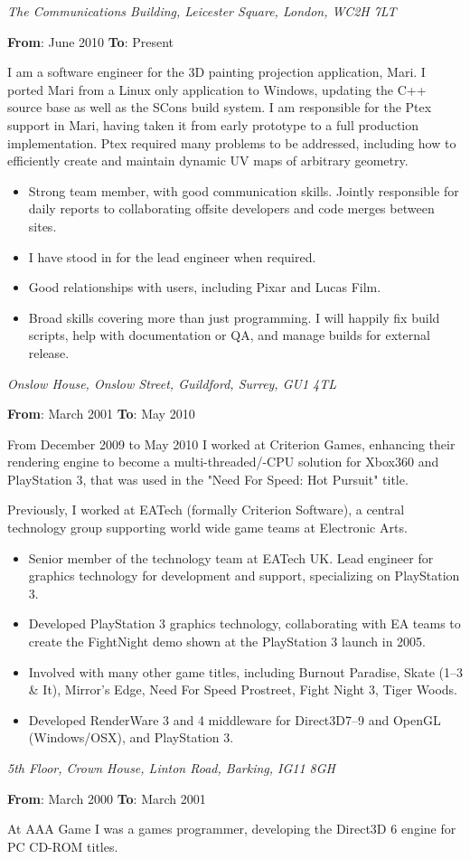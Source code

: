 \documentclass[a4paper,12pt]{article}
\newcommand{\cvheading}[1]{{\medskip\noindent\hspace{-5mm}{\sc #1}\par}}
\newcommand{\place}[2]{\vspace*{1ex}{\noindent\bf #1}\hfill{\it #2}\par}
\newcommand{\fromto}[2]{{\bf From}: #1 {\bf To}: #2\par}
\begin{document}
\cvheading{Work Experience}
\place{The Foundry VisionMongers}{The Communications Building, Leicester Square, London, WC2H 7LT}
\fromto{June 2010}{Present}
I am a software engineer for the 3D painting projection application, Mari. I ported Mari from a Linux only application to Windows, updating the C++ source base as well as the SCons build system. I am responsible for the Ptex support in Mari, having taken it from early prototype to a full production implementation. Ptex required many problems to be addressed, including how to efficiently create and maintain dynamic UV maps of arbitrary geometry.
\begin{itemize}
\item Strong team member, with good communication skills. Jointly responsible for daily reports to collaborating offsite developers and code merges between sites.
\item I have stood in for the lead engineer when required.
\item Good relationships with users, including Pixar and Lucas Film.
\item Broad skills covering more than just programming. I will happily fix build scripts, help with documentation or QA, and manage builds for external release.
\end{itemize}

\place{Electronic Arts}{Onslow House, Onslow Street, Guildford, Surrey, GU1 4TL}
\fromto{March 2001}{May 2010}
From December 2009 to May 2010 I worked at Criterion Games, enhancing their rendering engine to become a multi-threaded/-CPU solution for Xbox360 and PlayStation 3, that was used in the "Need For Speed: Hot Pursuit" title.

Previously, I worked at EATech (formally Criterion Software), a central technology group supporting world wide game teams at Electronic Arts.
\begin{itemize}
\item Senior member of the technology team at EATech UK. Lead engineer for graphics technology for development and support, specializing on PlayStation 3.
\item Developed PlayStation 3 graphics technology, collaborating with EA teams to create the FightNight demo shown at the PlayStation 3 launch in 2005.
\item Involved with many other game titles, including Burnout Paradise, Skate (1--3 \& It), Mirror's Edge, Need For Speed Prostreet, Fight Night 3, Tiger Woods.
\item Developed RenderWare 3 and 4 middleware for Direct3D7--9 and OpenGL (Windows/OSX), and PlayStation 3.
\end{itemize}
\place{AAA Game}{5th Floor, Crown House, Linton Road, Barking, IG11 8GH}
\fromto{March 2000}{March 2001}
At AAA Game I was a games programmer, developing the Direct3D 6 engine for PC CD-ROM titles.
\end{document}
